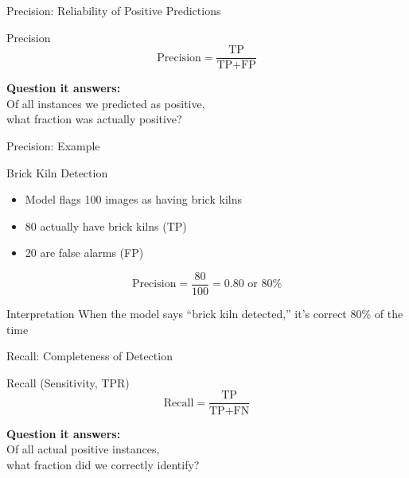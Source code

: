 \documentclass{beamer}
\begin{document}
\begin{frame}{Precision: Reliability of Positive Predictions}
\begin{definitionbox}{Precision}
\small
$$\text{Precision} = \frac{\text{TP}}{\text{TP} + \text{FP}}$$

\vspace{0.2cm}

\textbf{Question it answers:} \\
Of all instances we predicted as positive, \\
what fraction was actually positive?
\end{definitionbox}
\end{frame}

\begin{frame}{Precision: Example}
\begin{examplebox}{Brick Kiln Detection}
\small
\begin{itemize}
    \item Model flags 100 images as having brick kilns
    \item 80 actually have brick kilns (TP)
    \item 20 are false alarms (FP)
\end{itemize}

\vspace{0.2cm}

$$\text{Precision} = \frac{80}{100} = 0.80 \text{ or } 80\%$$
\end{examplebox}

\vspace{0.2cm}

\begin{keypointsbox}{Interpretation}
\small
When the model says ``brick kiln detected,'' it's correct 80\% of the time
\end{keypointsbox}
\end{frame}

\begin{frame}{Recall: Completeness of Detection}
\begin{definitionbox}{Recall (Sensitivity, TPR)}
\small
$$\text{Recall} = \frac{\text{TP}}{\text{TP} + \text{FN}}$$

\vspace{0.2cm}

\textbf{Question it answers:} \\
Of all actual positive instances, \\
what fraction did we correctly identify?
\end{definitionbox}
\end{frame}
\end{document}

